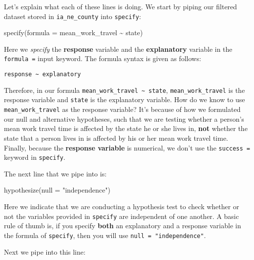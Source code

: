 \documentclass[
]{book}
\newenvironment{Shaded}{\begin{snugshade}}{\end{snugshade}}
\newcommand{\AttributeTok}[1]{\textcolor[rgb]{0.77,0.63,0.00}{#1}}
\newcommand{\FunctionTok}[1]{\textcolor[rgb]{0.00,0.00,0.00}{#1}}
\newcommand{\NormalTok}[1]{#1}
\newcommand{\SpecialCharTok}[1]{\textcolor[rgb]{0.00,0.00,0.00}{#1}}
\newcommand{\StringTok}[1]{\textcolor[rgb]{0.31,0.60,0.02}{#1}}
\begin{document}
Let's explain what each of these lines is doing.
We start by piping our filtered dataset stored in \texttt{ia\_ne\_county} into \texttt{specify}:

\begin{Shaded}
\begin{Highlighting}[]
\FunctionTok{specify}\NormalTok{(}\AttributeTok{formula =}\NormalTok{ mean\_work\_travel }\SpecialCharTok{\textasciitilde{}}\NormalTok{ state)}
\end{Highlighting}
\end{Shaded}

Here we \emph{specify} the \textbf{response} variable and the \textbf{explanatory} variable in the \texttt{formula\ =} input keyword.
The formula syntax is given as follows:

\begin{verbatim}
response ~ explanatory
\end{verbatim}

Therefore, in our formula \texttt{mean\_work\_travel\ \textasciitilde{}\ state}, \texttt{mean\_work\_travel} is the response variable and \texttt{state} is the explanatory variable.
How do we know to use \texttt{mean\_work\_travel} as the response variable?
It's because of how we formulated our null and alternative hypotheses, such that we are testing whether a person's mean work travel time is affected by the state he or she lives in, \textbf{not} whether the state that a person lives in is affected by his or her mean work travel time.
Finally, because the \textbf{response variable} is numerical, we don't use the \texttt{success\ =} keyword in \texttt{specify}.

The next line that we pipe into is:

\begin{Shaded}
\begin{Highlighting}[]
\FunctionTok{hypothesize}\NormalTok{(}\AttributeTok{null =} \StringTok{"independence"}\NormalTok{)}
\end{Highlighting}
\end{Shaded}

Here we indicate that we are conducting a hypothesis test to check whether or not the variables provided in \texttt{specify} are independent of one another.
A basic rule of thumb is, if you specify \textbf{both} an explanatory and a response variable in the formula of \texttt{specify}, then you will use \texttt{null\ =\ "independence"}.

Next we pipe into this line:
\end{document}
